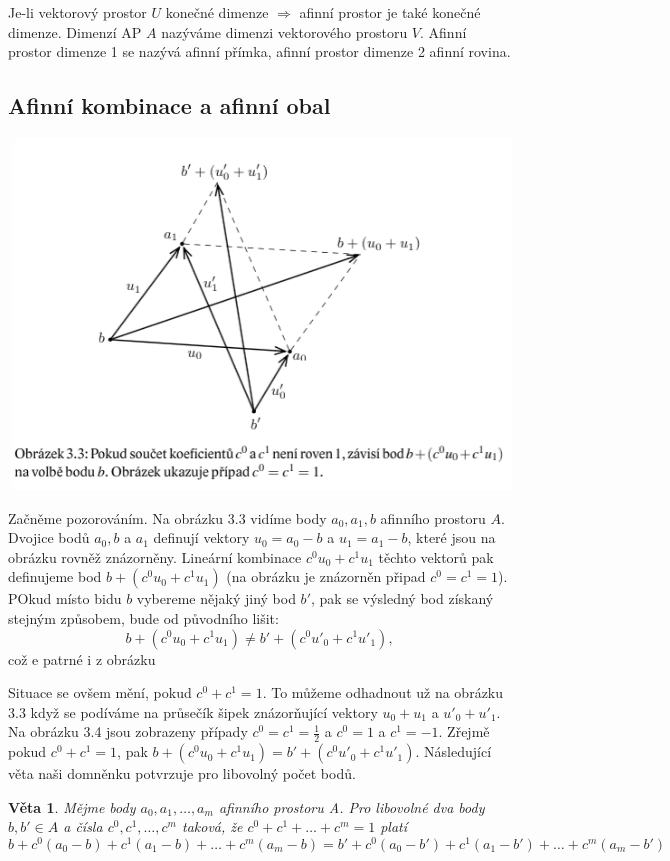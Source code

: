 \documentclass[12pt,a4paper]{article}
\newtheorem{sentence}{Věta}
\begin{document}
Je-li vektorový prostor $U$ konečné dimenze $\Rightarrow$ afinní prostor je také konečné dimenze. Dimenzí AP $A$ nazýváme dimenzi vektorového prostoru $V$. Afinní prostor dimenze 1 se nazývá afinní přímka, afinní prostor dimenze 2 afinní rovina.

\subsection{Afinní kombinace a afinní obal}
\begin{center}
	\includegraphics[scale=0.7]{img/AfinniObal}
\end{center}
Začněme pozorováním. Na obrázku 3.3 vidíme body $a_0,a_1,b$ afinního prostoru $A$. Dvojice bodů $a_0,b$ a $a_1$ definují vektory $u_0 = a_0 - b$ a $u_1 = a_1 - b$, které jsou na obrázku rovněž znázorněny. Lineární kombinace $c^0u_0 + c^1u_1$ těchto vektorů pak definujeme bod $b + (c^0u_0 + c^1u_1)$ (na obrázku je znázorněn připad $c^0 = c^1 = 1$). POkud místo bidu $b$ vybereme nějaký jiný bod $b'$, pak se výsledný bod získaný stejným způsobem, bude od původního lišit: $$b + (c^0u_0 + c^1u_1) \not= b' + (c^0u'_0 + c^1u'_1),$$
což e patrné i z obrázku

Situace se ovšem mění, pokud $c^0 + c^1 =  1$. To můžeme odhadnout už na obrázku 3.3 když se podíváme na průsečík šipek znázorňující vektory $u_0 + u_1$ a $u'_0 + u'_1$. Na obrázku 3.4 jsou zobrazeny případy $c^0 =  c^1 = \frac{1}{2}$ a $c^0 = 1$ a $c^1 = -1$. Zřejmě pokud $c^0 + c^1 = 1$, pak $b + (c^0u_0 + c^1u_1) = b' + (c^0u'_0 + c^1u'_1)$. Následující věta naši domněnku potvrzuje pro libovolný počet bodů.

\begin{sentence}
	Mějme body $a_0,a_1, \dots, a_m$ afinního prostoru A. Pro libovolné dva body $b,b' \in A$ a čísla $c^0, c^1, \dots, c^m$ taková, že  $c^0 + c^1 + \dots + c^m = 1$ platí
	$$b + c^0(a_0 - b) + c^1(a_1 - b) + \dots + c^m(a_m - b) = b' + c^0(a_0 - b') + c^1(a_1 - b') + \dots + c^m(a_m - b')$$
\end{sentence}
\end{document}
